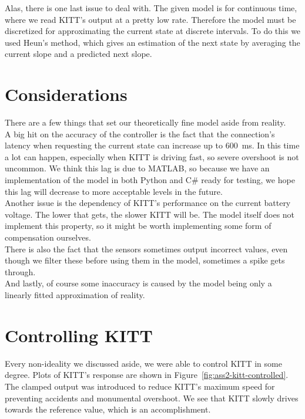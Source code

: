 \documentclass[11pt,titlepage]{report}
\begin{document}
Alas, there is one last issue to deal with. The given model is for continuous time, where we read KITT's output at a pretty low rate. Therefore the model must be discretized for approximating the current state at discrete intervals. To do this we used Heun's method, which gives an estimation of the next state by averaging the current slope and a predicted next slope. \cite{wikipedia-heuns}

\section{Considerations}
There are a few things that set our theoretically fine model aside from reality. \\
A big hit on the accuracy of the controller is the fact that the connection's latency when requesting the current state can increase up to \SI{600}{ms}. In this time a lot can happen, especially when KITT is driving fast, so severe overshoot is not uncommon. We think this lag is due to MATLAB, so because we have an implementation of the model in both Python and C\# ready for testing, we hope this lag will decrease to more acceptable levels in the future. \\
Another issue is the dependency of KITT's performance on the current battery voltage. The lower that gets, the slower KITT will be. The model itself does not implement this property, so it might be worth implementing some form of compensation ourselves. \\
There is also the fact that the sensors sometimes output incorrect values, even though we filter these before using them in the model, sometimes a spike gets through. \\
And lastly, of course some inaccuracy is caused by the model being only a linearly fitted approximation of reality. \\

\section{Controlling KITT}
Every non-ideality we discussed aside, we were able to control KITT in some degree. Plots of KITT's response are shown in Figure~\ref{fig:ass2-kitt-controlled}. The clamped output was introduced to reduce KITT's maximum speed for preventing accidents and monumental overshoot. We see that KITT slowly drives towards the reference value, which is an accomplishment.
\end{document}
